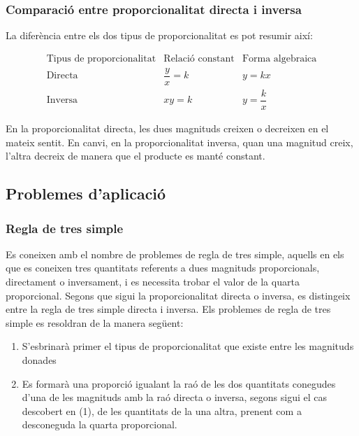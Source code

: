 \subsubsection{Comparació entre proporcionalitat directa i inversa}

La diferència entre els dos tipus de proporcionalitat es pot resumir així:

\[
\begin{array}{c|c|c}
\text{Tipus de proporcionalitat} & \text{Relació constant} & \text{Forma algebraica} \\
\hline
\text{Directa} & \dfrac{y}{x}=k & y=kx \\
\text{Inversa} & xy=k & y=\dfrac{k}{x}
\end{array}
\]

En la proporcionalitat directa, les dues magnituds creixen o decreixen en el mateix sentit. En canvi, en la proporcionalitat inversa, quan una magnitud creix, l'altra decreix de manera que el producte es manté constant.

\subsection{Problemes d’aplicació}

\subsubsection{Regla de tres simple}

Es coneixen amb el nombre de problemes de regla de tres simple, aquells en els
que es coneixen tres quantitats referents a dues magnituds proporcionals,
directament o inversament, i es necessita trobar el valor de la quarta
proporcional. Segons que sigui la proporcionalitat directa o inversa, es
distingeix entre la regla de tres simple directa i inversa. Els problemes de
regla de tres simple es resoldran de la manera següent:

\begin{enumerate}
\item[(1)] S’esbrinarà primer el tipus de proporcionalitat que existe
entre les magnituds donades

\item[(2)] Es formarà una proporció igualant la raó de les dos
quantitats conegudes d’una de les magnituds amb la raó directa o
inversa, segons sigui el cas descobert en (1), de les quantitats de la
una altra, prenent com a desconeguda la quarta proporcional.
\end{enumerate}

